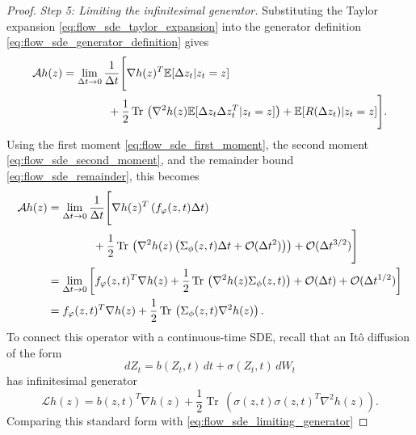 \begin{proof}
\medskip
\noindent\textit{Step 5: Limiting the infinitesimal generator.}
Substituting the Taylor expansion \eqref{eq:flow_sde_taylor_expansion} into the generator definition \eqref{eq:flow_sde_generator_definition} gives
\begin{align}
    \mathcal{A}h(z)
    &=
    \lim_{\Delta t\to 0}
    \frac{1}{\Delta t}
    \Bigg[
        \nabla h(z)^T
        \mathbb{E}[\Delta z_t| z_t=z] \notag \\
    &\qquad\qquad
        +\frac{1}{2}\operatorname{Tr}\,\left(
            \nabla^2h(z)
            \mathbb{E}[\Delta z_t\Delta z_t^T| z_t=z]
        \right)
        +\mathbb{E}[R(\Delta z_t)| z_t=z]
    \Bigg].
    \label{eq:flow_sde_generator_expansion}
\end{align}
Using the first moment \eqref{eq:flow_sde_first_moment}, the second moment \eqref{eq:flow_sde_second_moment}, and the remainder bound \eqref{eq:flow_sde_remainder}, this becomes
\begin{align}
    \mathcal{A}h(z)
    &=
    \lim_{\Delta t\to 0}
    \frac{1}{\Delta t}
    \Bigg[
        \nabla h(z)^T
        \left(f_\varphi(z,t)\Delta t\right) \notag \\
    &\qquad\qquad
        +\frac{1}{2}\operatorname{Tr}\,\left(
            \nabla^2h(z)
            \left(\Sigma_\phi(z,t)\Delta t+\mathcal{O}(\Delta t^2)\right)
        \right)
        +\mathcal{O}(\Delta t^{3/2})
    \Bigg] \notag \\
    &=
    \lim_{\Delta t\to 0}
    \left[
        f_\varphi(z,t)^T\nabla h(z)
        +\frac{1}{2}\operatorname{Tr}\,\left(
            \nabla^2h(z)\Sigma_\phi(z,t)
        \right)
        +\mathcal{O}(\Delta t)
        +\mathcal{O}(\Delta t^{1/2})
    \right] \notag \\
    &=
    f_\varphi(z,t)^T\nabla h(z)
    +\frac{1}{2}\operatorname{Tr}\,\left(
        \Sigma_\phi(z,t)\nabla^2h(z)
    \right).
    \label{eq:flow_sde_limiting_generator}
\end{align}
To connect this operator with a continuous-time SDE, recall that an It\^{o}
diffusion of the form
\begin{equation}
    dZ_t=b(Z_t,t)\,dt+\sigma(Z_t,t)\,dW_t
\end{equation}
has infinitesimal generator
\begin{equation}
    \mathcal{L}h(z)
    =
    b(z,t)^T\nabla h(z)
    +\frac{1}{2}\operatorname{Tr}\,\left(
        \sigma(z,t)\sigma(z,t)^T\nabla^2h(z)
    \right).
\end{equation}
Comparing this standard form with \eqref{eq:flow_sde_limiting_generator}

\end{proof}
